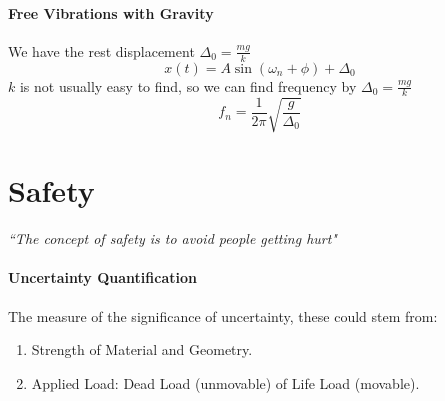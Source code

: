 \paragraph{Free Vibrations with Gravity} We have the rest displacement $\Delta_0=\frac{mg}{k}$
\begin{equation}
    x(t)=A\sin(\omega_n+\phi)+\Delta_0
\end{equation}
$k$ is not usually easy to find, so we can find frequency by  $\Delta_0=\frac{mg}{k}$
\begin{equation}
    f_n=\frac{1}{2\pi}\sqrt{\frac{g}{\Delta_0}}
\end{equation}
\section{Safety}
\begin{center}
    \textit{``The concept of safety is to avoid people getting hurt"}
\end{center}
\paragraph{Uncertainty Quantification} The measure of the significance of uncertainty, these could stem from:
    \begin{enumerate}
        \item Strength of Material and Geometry.
        \item Applied Load: Dead Load (unmovable) of Life Load (movable).
    \end{enumerate}
